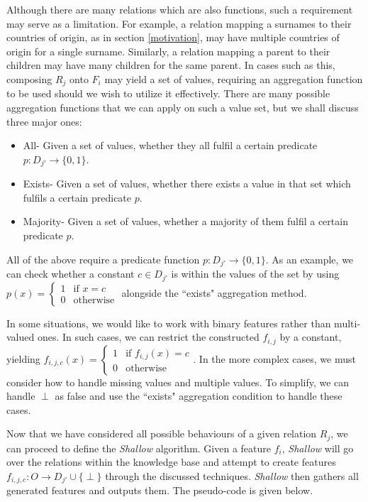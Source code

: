 \documentclass[twoside,11pt]{article}
\theoremstyle{definition}
\begin{document}
Although there are many relations which are also functions, such a requirement may serve as a limitation. For example, a relation mapping a surnames to their countries of origin, as in section \ref{motivation}, may have multiple countries of origin for a single surname. Similarly, a relation mapping a parent to their children may have many children for the same parent.
In cases such as this, composing $R_j$ onto $F_i$ may yield a set of values, requiring an aggregation function to be used should we wish to utilize it effectively. There are many possible aggregation functions that we can apply on such a value set, but we shall discuss three major ones:
\begin{itemize}
	\item All- Given a set of values, whether they all fulfil a certain predicate $p:D_{j'}\rightarrow\{0,1\}$.
	\item Exists- Given a set of values, whether there exists a value in that set which fulfils a certain predicate $p$.
	\item Majority- Given a set of values, whether a majority of them fulfil a certain predicate $p$.
\end{itemize}
All of the above require a predicate function $p:D_{j'}\rightarrow \{0,1\}$.
As an example, we can check whether a constant $c\in D_{j'}$ is within the values of the set by using $p(x)=\begin{cases}
1 & \mbox{if } x=c\\ 0 & \mbox{otherwise}
\end{cases}$ alongside the ``exists" aggregation method.

In some situations, we would like to work with binary features rather than multi-valued ones. In such cases, we can restrict the constructed $f_{i,j}$ by a constant, yielding $f_{i,j,c}(x)=\begin{cases}
1 & \mbox{if } f_{i,j}(x)=c\\
0 & \mbox{otherwise}
\end{cases}$. In the more complex cases, we must consider how to handle missing values and multiple values. To simplify, we can handle $\perp$ as false and use the ``exists" aggregation condition to handle these cases.

Now that we have considered all possible behaviours of a given relation $R_j$, we can proceed to define the \emph{Shallow} algorithm. Given a feature $f_i$, \emph{Shallow} will go over the relations within the knowledge base and attempt to create features $f_{i,j,c}:O\rightarrow D_{j'}\cup\{\perp\}$ through the discussed techniques. \emph{Shallow} then gathers all generated features and outputs them. The pseudo-code is given below.
\end{document}
